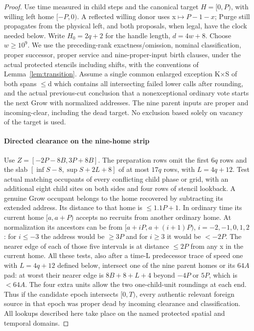 \begin{proof}
Use time measured in child steps and the canonical target \(H=[0,P)\), with willing left home \([- P,0)\). A reflected willing donor uses x\(\mapsto\)\(P- 1- x\); Purge still propagates from the physical left, and both proposals, when legal, have the clock needed below. Write \(H_0=2q+2\) for the handle length, \(d=4w+8\). Choose \(w\ge 10^9\). We use the preceding-rank exactness/omission, nominal classification, proper successor, proper service and nine-proper-input birth clauses, under the actual protected stencils including shifts, with the conventions of Lemma~\ref{lem:transition}. Assume a single common enlarged exception K\(\times\)S of both spans \(\le\)d which contains all intersecting failed lower calls after rounding, and the actual previous-cut conclusion that a nonexceptional ordinary vote starts the next Grow with normalized addresses. The nine parent inputs are proper and incoming-clear, including the dead target. No exclusion based solely on vacancy of the target is used.

\paragraph{Directed clearance on the nine-home strip}

Use \(Z=[- 2P- 8B,3P+8B]\). The preparation rows omit the first \(6q\) rows and the slab \([\inf S-8,\sup S+2L+8]\) of at most \(17q\) rows, with \(L=4q+12\). Test actual matching occupants of every conflicting child phase or grid, with an additional eight child sites on both sides and four rows of stencil lookback. A genuine Grow occupant belongs to the home recovered by subtracting its extended address. Its distance to that home is \(\le\)\(1.1P+1\). In ordinary time its current home \([a,a+P)\) accepts no recruits from another ordinary home. At normalization its ancestors can be from \([a+iP,a+(i+1)P)\), \(i=- 2,- 1,0,1,2\): for \(i\le - 3\) the address would be \(\ge\)\(3P\) and for \(i\ge 3\) it would be \(<- 2P\). The nearer edge of each of those five intervals is at distance \(\le\)\(2P\) from any x in the current home. All these tests, also after a time-L predecessor trace of speed one with \(L=4q+12\) defined below, intersect one of the nine parent homes or its \(64A\) pad: at worst their nearer edge is \(8B+8+L+4\) beyond \(- 4P\) or \(5P\), which is \(<64A\). The four extra units allow the two one-child-unit roundings at each end. Thus if the candidate epoch intersects \([0,T)\), every authentic relevant foreign source in that epoch was proper dead by incoming clearance and classification. All lookups described here take place on the named protected spatial and temporal domains.


\end{proof}
